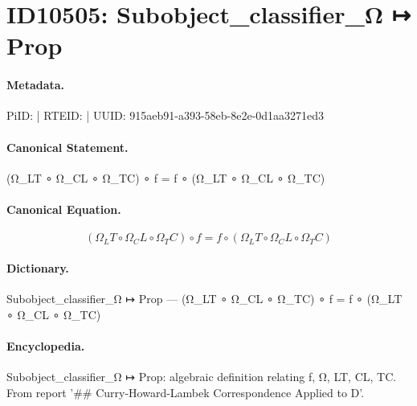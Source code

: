 \section*{ID10505: Subobject\_classifier\_Ω ↦ Prop}
\paragraph{Metadata.}
PiID:  | RTEID:  | UUID: 915aeb91-a393-58eb-8e2e-0d1aa3271ed3

\paragraph{Canonical Statement.}
(Ω\_LT ∘ Ω\_CL ∘ Ω\_TC) ∘ f = f ∘ (Ω\_LT ∘ Ω\_CL ∘ Ω\_TC)

\paragraph{Canonical Equation.}
\[
(Ω_LT ∘ Ω_CL ∘ Ω_TC) ∘ f = f ∘ (Ω_LT ∘ Ω_CL ∘ Ω_TC)
\]

\paragraph{Dictionary.}
Subobject\_classifier\_Ω ↦ Prop — (Ω\_LT ∘ Ω\_CL ∘ Ω\_TC) ∘ f = f ∘ (Ω\_LT ∘ Ω\_CL ∘ Ω\_TC)

\paragraph{Encyclopedia.}
Subobject\_classifier\_Ω ↦ Prop: algebraic definition relating f, Ω, LT, CL, TC. From report '\#\# Curry-Howard-Lambek Correspondence Applied to D'.
